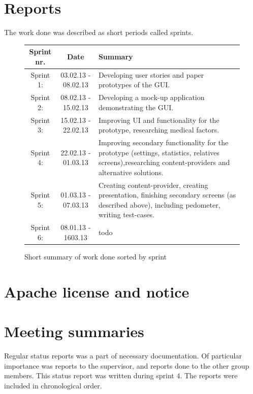 \section{Reports}
The work done was described as short periods called sprints. 
\begin{figure}
\caption{Short summary of work done sorted by sprint}
\begin{tabular}{|c|c|p{7cm}|}
\hline
Sprint nr. & Date & Summary\\
\hline
Sprint 1: & 03.02.13 - 08.02.13 & Developing user stories and paper prototypes of the GUI.\\ 
\hline
Sprint 2: & 08.02.13 - 15.02.13 & Developing a mock-up application demonstrating the GUI.\\
\hline
Sprint 3: & 15.02.13 - 22.02.13 & Improving UI and functionality for the prototype, researching medical factors. \\
\hline
Sprint 4: & 22.02.13 - 01.03.13 & Improving secondary functionality for the prototype (settings, statistics, relatives screens),researching content-providers and alternative solutions. \\
\hline
Sprint 5: & 01.03.13 - 07.03.13 & Creating content-provider, creating presentation, finishing secondary screens (as described above), including pedometer, writing test-cases.\\
\hline
Sprint 6: & 08.01.13 - 1603.13 &todo\\
\hline
\end{tabular} 
\label{tab:sprintList}
\end{figure}
\newpage

\section{Apache license and notice}
\label{appendix:license}

\section{Meeting summaries}
Regular status reports was a part of necessary documentation. Of particular importance was reports to the supervisor, and reports done to the other group members. This status report was written during sprint 4. The reports were included in chronological order.










